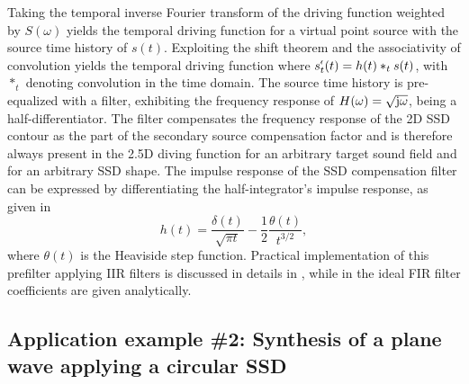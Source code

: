Taking the temporal inverse Fourier transform of the driving function weighted by $S(\omega)$ yields the temporal driving function for a virtual point source with the source time history of $s(t)$.
Exploiting the shift theorem and the associativity of convolution yields the temporal driving function
where $s^{\nshortmid}_t( t ) = h(t) \ast_t s( t )$, with $\ast_t$ denoting convolution in the time domain.
The source time history is pre-equalized with a filter, exhibiting the frequency response of $H(\omega) = \sqrt{\mathrm{j} \omega}$, being a half-differentiator. 
The filter compensates the frequency response of the 2D SSD contour as the part of the secondary source compensation factor and is therefore always present in the 2.5D diving function for an arbitrary target sound field and for an arbitrary SSD shape.
The impulse response of the SSD compensation filter can be expressed by differentiating the half-integrator's impulse response, as given in \cite{Deregowski1983}
\begin{equation}
h(t) = \frac{\delta(t)}{\sqrt{\pi t}} - \frac{1}{2} \frac{\theta(t)}{t^{3/2}},
\end{equation}
where $\theta(t)$ is the Heaviside step function.
Practical implementation of this prefilter applying IIR filters is discussed in details in \cite{Schultz2013:IIR_prefilters}, while in \cite[Sec.s 2.5]{Schultz2016} the ideal FIR filter coefficients are given analytically.

\subsection*{Application example \#2: Synthesis of a plane wave applying a circular SSD}

